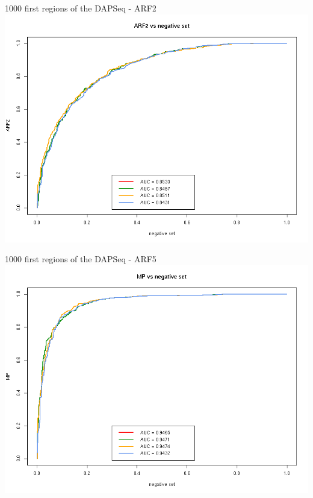 \documentclass{beamer}
\begin{document}
\begin{frame}{1000 first regions of the DAPSeq - ARF2}
  \includegraphics[width=1\textwidth,height=0.8\textheight,center]{ROC_ARF2_negative_set_all_regions.png}
\end{frame}

\begin{frame}{1000 first regions of the DAPSeq - ARF5}
  \includegraphics[width=1\textwidth,height=0.8\textheight,center]{ROC_MP_negative_set_all_regions.png}
\end{frame}
\end{document}
